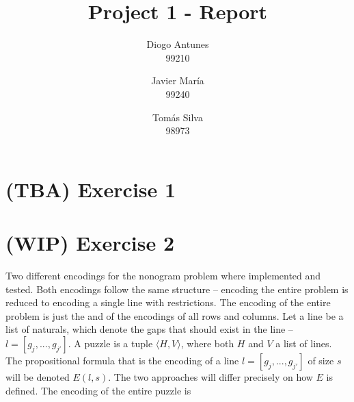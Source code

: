 \documentclass[12pt]{article}
\newcommand{\wip}{\textbf{(WIP) }}
\newcommand{\tba}{\textbf{(TBA) }}
\begin{document}
\title{Project 1 - Report}
\author{
  Diogo Antunes\\
  99210
  \and
  Javier María\\
  99240
  \and
  Tomás Silva\\
  98973
}

\maketitle

\section*{\tba Exercise 1}

\section*{\wip Exercise 2}


Two different encodings for the nonogram problem where implemented and tested.
Both encodings follow the same structure -- encoding the entire problem is reduced to encoding a single line with restrictions.
The encoding of the entire problem is just the and of the encodings of all rows and columns.
Let a line be a list of naturals, which denote the gaps that should exist in the line -- $l = [g_j, ..., g_{j'}]$.
A puzzle is a tuple $\langle H, V\rangle$, where both $H$ and $V$ a list of lines.
The propositional formula that is the encoding of a line $l = [g_j, ..., g_{j'}]$ of size $s$ will be denoted $E(l, s)$.
The two approaches will differ precisely on how $E$ is defined.
The encoding of the entire puzzle is
\end{document}
